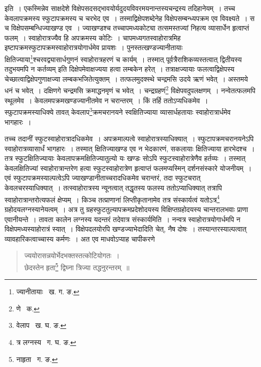 \documentclass[11pt, openany]{book}
\begin{document}
\indent इति~। एकस्मिन्नेव साक्षदेशे विक्षेपसदसद्भावयोर्यदुदयविवरमयनान्तस्यचन्द्रस्य तदिहानेयम्~। तच्च केवलापक्रमस्य स्फुटापक्रमस्य 
च चरभेद एव~। तस्माद्विक्षेपशब्देनेह विक्षेपसम्बन्ध्यपक्रम एव विवक्ष्यते~। स च विक्षेपसम्बन्धिज्याखण्ड एव~। ज्याखण्डश्च तच्चापमध्यकोट्या तत्समस्तज्यां निहत्य व्यासार्धेन हृत्वाप्तं फलम्~। स्वाहोरात्रज्यैव हि अपक्रमस्य कोटिः~। चापमध्यगतस्वाहोरात्रमिह इष्टापक्रमस्फुटापक्रमस्वाहोरात्रयोगार्धमेव प्रायशः~। पुनस्तत्खण्डज्यानीतायाः क्षितिज्याया\renewcommand{\thefootnote}{२}\footnote{ज्यानीतायाः \textendash\ ख. ग. ङ.}श्चरवद्व्यासार्धगुणनं स्वाहोरात्रहरणं च कार्यम्~। तस्मात् पूर्वत्रैराशिकव्यस्तत्वात् द्वितीयस्य तदुभयमपि न कर्तव्यम् इति दिक्षेपमेवाक्षज्यया हत्वा लम्बकेन हरेत्~। तत्राक्षज्यायाः फलत्वाद्विक्षेपस्य चेच्छात्वाद्विक्षेपगुणाक्षज्या लम्बकभजितेत्युक्तम्~। तत्फलमुदक्स्थे चन्द्रमसि उदये ऋणं भवेत्~। अस्तमये धनं च भवेत्~। दक्षिणगे चन्द्रमसि क्रमाद्धनमृणं च भवेत्~। चन्द्रग्रहणं\renewcommand{\thefootnote}{३}\footnote{णे \textendash\ क.} विक्षेपवदुपलक्षणम्~।
नन्वेतत्फलमपि स्थूलमेव~। केवलमपक्रमखण्डज्यानीतमेव न चरान्तरम्~। किं तर्हि ततोऽप्यधिकमेव~। स्फुटापक्रमस्याधिक्ये तावत् केवलाप\renewcommand{\thefootnote}{४}\footnote{वेलाप \textendash\ ख. घ. ङ.}क्रमचरानयने स्वक्षितिज्याया व्यासार्धहतायाः स्वाहोरात्रार्धमेव भागहारः~। 

\newpage

\noindent तच्च तदानीं स्फुटस्वाहोरात्रादधिकमेव~। अपक्रमाल्पत्वे स्वाहोरात्रस्याधिक्यात्~। स्फुटापक्रमचरानयनेऽपि स्वाहोरात्रव्यासार्धं भागहारः~। तस्मात् क्षितिज्याखण्ड एव न भेदकारणं, सकलायाः क्षितिज्याया हारभेदश्च~। तत्र स्फुटक्षितिज्यायाः केवलापक्रमक्षितिज्यातुल्यो यः खण्डः सोऽपि स्फुटस्वाहोरात्रेणैव हर्तव्यः~। तस्मात् केवलक्षितिज्यां स्वाहोरात्रान्तरेण हत्वा स्फुटस्वाहोरात्रेण हृत्वाप्तं फलमप्यस्मिन्
दर्शनसंस्कारे योजनीयम्~। एवं स्फुटापक्रमस्याल्पत्वेऽपि ज्याखण्डानीताच्चरादधिकमेव चरान्तरं, तदा स्फुटचरात् केवलचरस्याधिक्यात्~। तत्स्वाहोरात्रस्य न्यूनत्वात् तद्धृतस्य फलस्य ततोऽप्याधिक्यात् तत्रापि स्वाहोरात्रान्तरोत्यफलं क्षेप्यम्~। किञ्च तत्प्राणानां लिप्तीकृतानामेव तत्र
संस्कार्यत्वं यतोऽत्र\renewcommand{\thefootnote}{१}\footnote{त्र लग्नस्य \textendash\ ग. घ. ङ.} ग्रहोदयलग्नस्यानेयत्वम्~। अत्र तु ग्रहस्फुटतुल्यापक्रमप्रदेशोदयस्य विक्षिप्तग्रहोदयस्य चान्तरालभवाः प्राणा एवानीयन्ते~। तावता कालेन लग्नस्य यदन्तरं तदेवात्र संस्कार्यमिति~। नन्वत्र स्वाहोरात्रयोगार्धमपि न विक्षेपमध्यस्याहोरात्रं स्यात्~। विक्षेपदलयोरपि खण्डज्याभेदादिति चेत्, नैष दोषः~। तस्यान्तरस्याल्पत्वात् व्यावहारिकत्वाच्चास्य कर्मणः~। अत एव माधवोऽप्याह चापीकरणे\textendash 
 
\begin{quote}
{\qt ज्ययोरासन्नयोर्भेदभक्तस्तत्कोटियोगतः~। \\
छेदस्तेन हृता\renewcommand{\thefootnote}{२}\footnote{नाहृता \textendash\ ग. ङ.} द्विघ्ना त्रिज्या तद्धनुरन्तरम्~॥} 
\end{quote}
\end{document}
